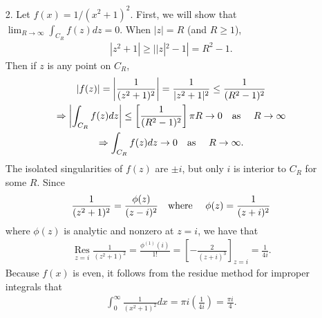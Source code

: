 \documentclass[a4paper,12pt]{article}
\begin{document}
\begin{enumerate}
    \item[2.]
        Let $f(x) = 1/(x^2 + 1)^2$. First, we will show that $\lim_{R \to \infty} \int_{C_R} f(z) dz = 0$. When $|z| = R$ (and $R \geq 1$),
        \begin{gather*}
            |z^2 + 1| \geq ||z|^2 - 1| = R^2 - 1.
        \end{gather*}
        Then if $z$ is any point on $C_R$,
        \begin{gather*}
            |f(z)| = \left| \frac{1}{(z^2 + 1)^2} \right| = \frac{1}{|z^2 + 1|^2} \leq \frac{1}{(R^2 - 1)^2} \\
            \Rightarrow \left| \int_{C_R} f(z) dz \right| \leq \left[ \frac{1}{(R^2 - 1)^2} \right] \pi R \to 0 \text{\quad as \quad} R \to \infty \\
            \Rightarrow \int_{C_R} f(z) dz \to 0 \text{\quad as \quad} R \to \infty.
        \end{gather*}
        The isolated singularities of $f(z)$ are $\pm i$, but only $i$ is interior to $C_R$ for some $R$. Since
        \begin{align*}
            \frac{1}{(z^2 + 1)^2} = \frac{\phi(z)}{(z - i)^2} \text{\quad where \quad} \phi(z) = \frac{1}{(z + i)^2}
        \end{align*}
        where $\phi(z)$ is analytic and nonzero at $z = i$, we have that
        \begin{align*}
            \underset{z = i}{\text{\ Res\ }} \frac{1}{(z^2 + 1)^2} = \frac{\phi^{(1)}(i)}{1!} = \left[ -\frac{2}{(z + i)^3} \right]_{z = i} = \frac{1}{4i}.
        \end{align*}
        Because $f(x)$ is even, it follows from the residue method for improper integrals that
        \begin{align*}
            \int_0^\infty \frac{1}{(x^2 + 1)^2} dx = \pi i \left( \frac{1}{4i} \right) = \frac{\pi i}{4}.
        \end{align*}


\end{enumerate}
\end{document}
